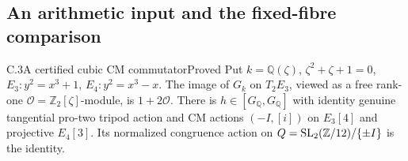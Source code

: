 \subsection{An arithmetic input and the fixed-fibre comparison}

\begin{statement}{C.3}{A certified cubic CM commutator}{Proved}
Put \(k=\mathbb Q(\zeta)\), \(\zeta^2+\zeta+1=0\),
\(E_3:y^2=x^3+1\), \(E_4:y^2=x^3-x\).
The image of \(G_k\) on \(T_2E_3\), viewed as a free rank-one
\(\mathcal O=\mathbb Z_2[\zeta]\)-module, is \(1+2\mathcal O\).
There is \(h\in[G_{\mathbb Q},G_{\mathbb Q}]\) with identity
genuine tangential pro-two tripod action and CM actions
\((-I,[i])\) on \(E_3[4]\) and projective \(E_4[3]\).
Its normalized congruence action on
\(Q={\rm SL}_2(\mathbb Z/12)/\{\pm I\}\) is the identity.
\end{statement}
